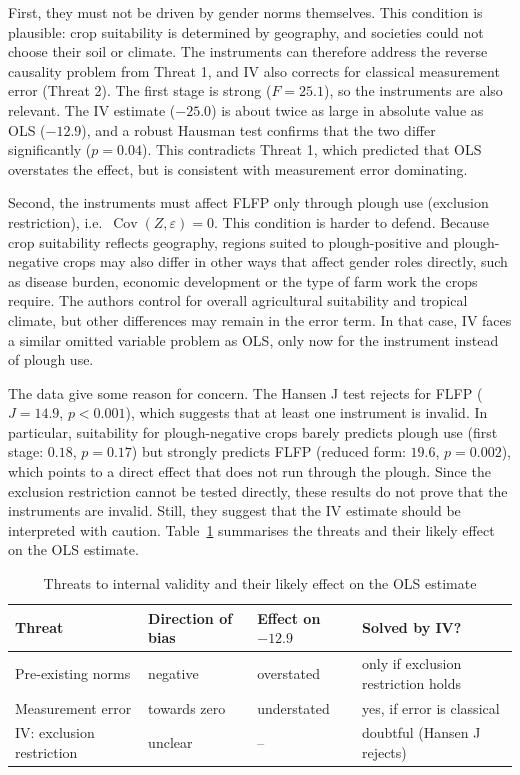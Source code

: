 \documentclass[12pt,a4paper]{article}
\begin{document}
First, they must not be driven by gender norms themselves. This condition is plausible: crop suitability is determined by geography, and societies could not choose their soil or climate. The instruments can therefore address the reverse causality problem from Threat 1, and IV also corrects for classical measurement error (Threat 2). The first stage is strong ($F = 25.1$), so the instruments are also relevant. The IV estimate ($-25.0$) is about twice as large in absolute value as OLS ($-12.9$), and a robust Hausman test confirms that the two differ significantly ($p = 0.04$). This contradicts Threat 1, which predicted that OLS overstates the effect, but is consistent with measurement error dominating.

Second, the instruments must affect FLFP only through plough use (exclusion restriction), i.e.\ $\operatorname{Cov}(Z, \varepsilon) = 0$. This condition is harder to defend. Because crop suitability reflects geography, regions suited to plough-positive and plough-negative crops may also differ in other ways that affect gender roles directly, such as disease burden, economic development or the type of farm work the crops require. The authors control for overall agricultural suitability and tropical climate, but other differences may remain in the error term. In that case, IV faces a similar omitted variable problem as OLS, only now for the instrument instead of plough use.

The data give some reason for concern. The Hansen J test rejects for FLFP ($J = 14.9$, $p < 0.001$), which suggests that at least one instrument is invalid. In particular, suitability for plough-negative crops barely predicts plough use (first stage: $0.18$, $p = 0.17$) but strongly predicts FLFP (reduced form: $19.6$, $p = 0.002$), which points to a direct effect that does not run through the plough. Since the exclusion restriction cannot be tested directly, these results do not prove that the instruments are invalid. Still, they suggest that the IV estimate should be interpreted with caution. Table~\ref{tab:threats} summarises the threats and their likely effect on the OLS estimate.

\begin{table}[htbp]
\centering
\caption{Threats to internal validity and their likely effect on the OLS estimate}
\label{tab:threats}
\small
\begin{tabular}{llll}
\hline
Threat & Direction of bias & Effect on $-12.9$ & Solved by IV? \\
\hline
Pre-existing norms & negative & overstated & only if exclusion restriction holds \\
Measurement error & towards zero & understated & yes, if error is classical \\
IV: exclusion restriction & unclear & -- & doubtful (Hansen J rejects) \\
\hline
\end{tabular}
\end{table}
\end{document}
